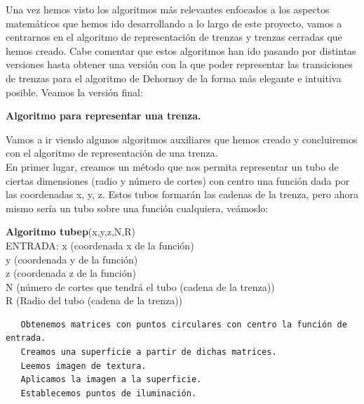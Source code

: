 \newpage

Una vez hemos visto los algoritmos más relevantes enfocados a los aspectos matemáticos que hemos ido desarrollando a lo largo de este proyecto, vamos a centrarnos en el algoritmo de representación de trenzas y trenzas cerradas que hemos creado. Cabe comentar que estos algoritmos han ido pasando por distintas versiones hasta obtener una versión con la que poder representar las transiciones de trenzas para el algoritmo de Dehornoy de la forma más elegante e intuitiva posible. Veamos la versión final:

 \begin{center}
 	\textbf{Algoritmo para representar una trenza.}
 \end{center} 
 Vamos a ir viendo algunos algoritmos auxiliares que hemos creado y concluiremos con el algoritmo de representación de una trenza. \\
 En primer lugar, creamos un método que nos permita representar un tubo de ciertas dimensiones (radio y número de cortes) con centro una función dada por las coordenadas x, y, z. Estos tubos formarán las cadenas de la trenza, pero ahora mismo sería un tubo sobre una función cualquiera, veámoslo:
 
 \begin{alg}
 	\textbf{Algoritmo tubep}(x,y,z,N,R)\\
 	ENTRADA: x (coordenada x de la función)\\
 	\hspace*{2.2cm} y (coordenada y de la función)\\
 	\hspace*{2.2cm} z (coordenada z de la función)\\
 	\hspace*{2.2cm} N (número de cortes que tendrá el tubo (cadena de la trenza))\\
 	\hspace*{2.2cm} R (Radio del tubo (cadena de la trenza))
 	
\begin{lstlisting}
   Obtenemos matrices con puntos circulares con centro la función de entrada.
   Creamos una superficie a partir de dichas matrices.
   Leemos imagen de textura.
   Aplicamos la imagen a la superficie.
   Establecemos puntos de iluminación.
   
\end{lstlisting}
 \end{alg}
 
